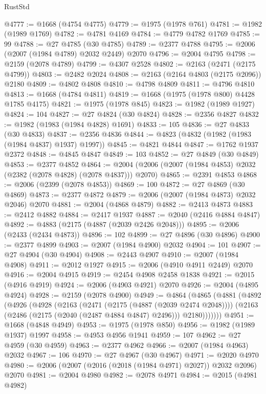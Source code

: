 \begin{lexlean}{RustStd}
\begin{coremodule}
@4777 := @1668 (@4754 @4775)
@4779 := @1975 (@1978 @761)
@4781 := @1982 (@1989 @1769)
@4782 := @4781 @4169
@4784 := @4779 @4782 @1769
@4785 := 99
@4788 := @27 @4785 (@30 @4785)
@4789 := @2377 @4788
@4795 := @2006 (@2007 (@1984 @4789) @2032 @2449) @2070
@4796 := @2004 @4795
@4798 := @2159 (@2078 @4789)
@4799 := @4307 @2528
@4802 := @2163 (@2471 (@2175 @4799))
@4803 := @2482 @2024
@4808 := @2163 (@2164 @4803 (@2175 @2096)) @2180
@4809 := @4802 @4808
@4810 := @4798 @4809
@4811 := @4796 @4810
@4813 := @1668 (@4784 @4811)
@4819 := @1668 (@1975 (@1978 @800) @4428 @1785 @4175)
@4821 := @1975 (@1978 @845)
@4823 := @1982 (@1989 @1927)
@4824 := 104
@4827 := @27 @4824 (@30 @4824)
@4828 := @2356 @4827
@4832 := @1982 (@1983 (@1984 @4828) @1691)
@4833 := 105
@4836 := @27 @4833 (@30 @4833)
@4837 := @2356 @4836
@4844 := @4823 (@4832 (@1982 (@1983 (@1984 @4837) @1937) @1997))
@4845 := @4821 @4844
@4847 := @1762 @1937 @2372
@4848 := @4845 @4847
@4849 := 103
@4852 := @27 @4849 (@30 @4849)
@4853 := @2377 @4852
@4864 := @2004 (@2006 (@2007 (@1984 @4853) @2032 (@2382 (@2078 @4828) (@2078 @4837))) @2070)
@4865 := @2391 @4853
@4868 := @2006 (@2399 (@2078 @4853))
@4869 := 100
@4872 := @27 @4869 (@30 @4869)
@4873 := @2377 @4872
@4879 := @2006 (@2007 (@1984 @4873) @2032 @2046) @2070
@4881 := @2004 (@4868 @4879)
@4882 := @2413 @4873
@4883 := @2412 @4882
@4884 := @2417 @1937
@4887 := @2040 (@2416 @4884 @4847)
@4892 := @4883 (@2175 (@4887 (@2039 @2426 @2048)))
@4895 := @2006 (@2433 (@2434 @4873))
@4896 := 102
@4899 := @27 @4896 (@30 @4896)
@4900 := @2377 @4899
@4903 := @2007 (@1984 @4900) @2032
@4904 := 101
@4907 := @27 @4904 (@30 @4904)
@4908 := @2443 @4907
@4910 := @2007 (@1984 @4908)
@4911 := @2012 @1927
@4915 := @2006 (@4910 @4911 @2449) @2070
@4916 := @2004 @4915
@4919 := @2454 @4908 @2458 @1838
@4921 := @2015 (@4916 @4919)
@4924 := @2006 (@4903 @4921) @2070
@4926 := @2004 (@4895 @4924)
@4928 := @2159 (@2078 @4900)
@4949 := @4864
    (@4865
      (@4881
        (@4892
          (@4926
            (@4928
              (@2163
                (@2471 (@2175 (@4887 (@2039 @2474 @2048))))
                (@2163 (@2486 (@2175 (@2040 (@2487 @4884 @4847) @2496))) @2180)))))))
@4951 := @1668 (@4848 @4949)
@4953 := @1975 (@1978 @850)
@4956 := @1982 (@1989 @1937) @1997
@4958 := @4953 @4956 @1941
@4959 := 107
@4962 := @27 @4959 (@30 @4959)
@4963 := @2377 @4962
@4966 := @2007 (@1984 @4963) @2032
@4967 := 106
@4970 := @27 @4967 (@30 @4967)
@4971 := @2020 @4970
@4980 := @2006 (@2007 (@2016 (@2018 (@1984 @4971) @2027)) @2032 @2096) @2070
@4981 := @2004 @4980
@4982 := @2078 @4971
@4984 := @2015 (@4981 @4982)

\end{coremodule}
\end{lexlean}
